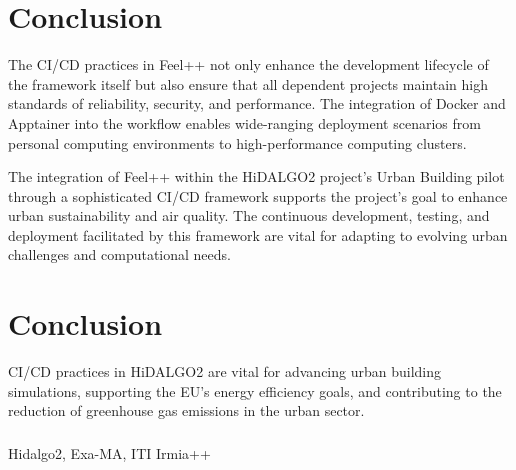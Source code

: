 \documentclass[runningheads]{llncs}
\begin{document}
\section{Conclusion}
The CI/CD practices in Feel++ not only enhance the development lifecycle of the framework itself but also ensure that all dependent projects maintain high standards of reliability, security, and performance. The integration of Docker and Apptainer into the workflow enables wide-ranging deployment scenarios from personal computing environments to high-performance computing clusters.

The integration of Feel++ within the HiDALGO2 project's Urban Building pilot through a sophisticated CI/CD framework supports the project's goal to enhance urban sustainability and air quality. The continuous development, testing, and deployment facilitated by this framework are vital for adapting to evolving urban challenges and computational needs.


\section{Conclusion}
CI/CD practices in HiDALGO2 are vital for advancing urban building simulations, supporting the EU's energy efficiency goals, and contributing to the reduction of greenhouse gas emissions in the urban sector.

\begin{credits}
\subsubsection{\ackname} Hidalgo2, Exa-MA, ITI Irmia++ 

\end{credits}



\end{document}
